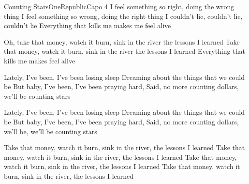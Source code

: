 \begin{song}{Counting Stars}{OneRepublic}{Capo 4}
I feel something so right, doing the wrong thing
I feel something so wrong, doing the right thing
I couldn't lie, couldn't lie, couldn't lie
Everything that kills me makes me feel alive


Oh, take that money, watch it burn, sink in the river the lessons I learned
Take that money, watch it burn, sink in the river the lessons I learned
Everything that kills me makes feel alive

Lately, I've been, I've been losing sleep
Dreaming about the things that we could be
But baby, I've been, I've been praying hard,
Said, no more counting dollars, we'll be counting stars



Lately, I've been, I've been losing sleep
Dreaming about the things that we could be
But baby, I've been, I've been praying hard,
Said, no more counting dollars, we'll be, we'll be counting stars

Take that money, watch it burn, sink in the river, the lessons I learned
Take that money, watch it burn, sink in the river, the lessons I learned
Take that money, watch it burn, sink in the river, the lessons I learned
Take that money, watch it burn, sink in the river, the lessons I learned

\end{song}